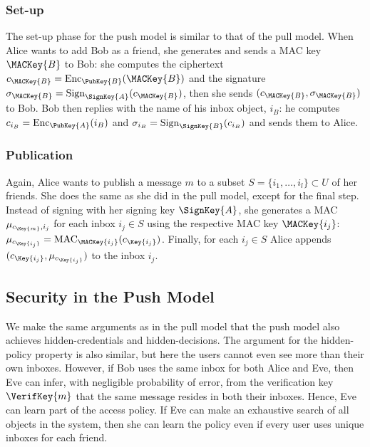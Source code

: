 \subsubsection{Set-up}

The set-up phase for the push model is similar to that of the pull model.
When Alice wants to add Bob as a friend, she generates and sends a \ac{MAC} key 
\(\MACKey{B}\) to Bob:
she computes the ciphertext \(c_{\MACKey{B}} = \Enc_{\PubKey{B}}( \MACKey{B} 
  )\) and the signature \(\sigma_{\MACKey{B}} = \Sign_{\SignKey{A}}( 
  c_{\MACKey{B}} )\), then she sends \((c_{\MACKey{B}}, \sigma_{\MACKey{B}})\) 
to Bob.
Bob then replies with the name of his inbox object, \(i_B\):
he computes \(c_{i_B} = \Enc_{\PubKey{A}}( i_B )\) and \(\sigma_{i_B} 
  = \Sign_{\SignKey{B}}( c_{i_B} )\) and sends them to Alice.

\subsubsection{Publication}

Again, Alice wants to publish a message \(m\) to a subset \(S = \{i_1, \ldots, 
  i_l\}\subset U\) of her friends.
She does the same as she did in the pull model, except for the final step.
Instead of signing with her signing key \(\SignKey{A}\), she generates 
a \ac{MAC} \(\mu_{c_{\Key{m}}, i_j}\) for each inbox \(i_j\in S\) using the 
respective \ac{MAC} key \(\MACKey{i_j}\): \(\mu_{c_{\Key{i_j}}} 
  = \MAC_{\MACKey{i_j}}( c_{\Key{i_j}} )\).
Finally, for each \(i_j\in S\)  Alice appends \((c_{\Key{i_j}}, 
  \mu_{c_{\Key{i_j}}})\) to the inbox \(i_j\).

\subsection{Security in the Push Model}\label{sec:PushModelSec}

We make the same arguments as in the pull model that the push model also 
achieves hidden-credentials and hidden-decisions.
The argument for the hidden-policy property is also similar, but here the users 
cannot even see more than their own inboxes.
However, if Bob uses the same inbox for both Alice and Eve, then Eve can infer, 
with negligible probability of error, from the verification key 
\(\VerifKey{m}\) that the same message resides in both their inboxes.
Hence, Eve can learn part of the access policy.
If Eve can make an exhaustive search of all objects in the system, then she can 
learn the policy even if every user uses unique inboxes for each friend.

